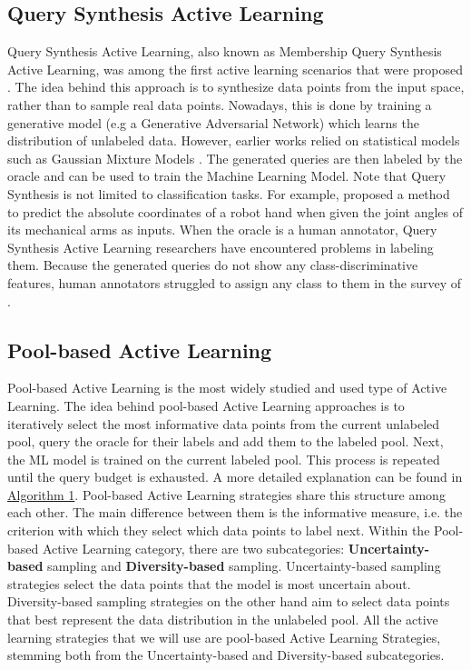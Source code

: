 \subsection{Query Synthesis Active Learning}
\label{sec:QuerySynthesisActiveLearning}
Query Synthesis Active Learning, also known as Membership Query Synthesis Active Learning, was among the first active learning scenarios
that were proposed \cite{angluin1988queries}. The idea behind this approach is to synthesize data points from the input space, rather than
to sample real data points. Nowadays, this is done by training a generative model (e.g a Generative Adversarial Network) \cite{zhu2017generative}
which learns the distribution of unlabeled data. However, earlier works relied on statistical models such as Gaussian Mixture Models 
\cite{cohn1996active}. The generated queries are then labeled by the oracle and can be used to train the Machine Learning Model. Note that
Query Synthesis is not limited to classification tasks. For example, \cite{cohn1996active} proposed a method to predict the absolute coordinates
of a robot hand when given the joint angles of its mechanical arms as inputs. When the oracle is a human annotator, Query Synthesis Active Learning
researchers have encountered problems in labeling them. Because the generated queries do not show any class-discriminative features, human annotators
struggled to assign any class to them in the survey of \cite{baum1992query}.


\subsection{Pool-based Active Learning}
\label{sec:PoolBasedActiveLearning}
Pool-based Active Learning is the most widely studied and used type of Active Learning. The idea behind pool-based Active Learning approaches
is to iteratively select the most informative data points from the current unlabeled pool, query the oracle for their labels and add them to the
labeled pool. Next, the ML model is trained on the current labeled pool. This process is repeated until the query budget is exhausted. A more detailed
explanation can be found in \href{alg:PoolBasedActiveLearning}{Algorithm 1}. Pool-based Active Learning strategies share this structure among each other.
The main difference between them is the informative measure, i.e. the criterion with which they select which data points to label next. Within the 
Pool-based Active Learning category, there are two subcategories: \textbf{Uncertainty-based} sampling and \textbf{Diversity-based} sampling. 
Uncertainty-based sampling strategies select the data points that the model is most uncertain about. Diversity-based sampling strategies on the other
hand aim to select data points that best represent the data distribution in the unlabeled pool. All the active learning strategies that we will use
are pool-based Active Learning Strategies, stemming both from the Uncertainty-based and Diversity-based subcategories.

